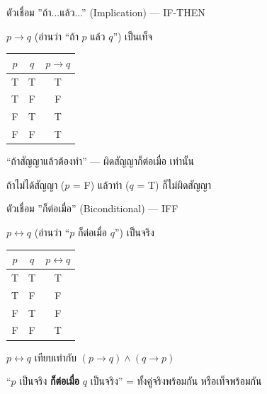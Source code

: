 \documentclass[11pt, aspectratio=169]{beamer}
\begin{document}
\begin{frame}{ตัวเชื่อม ''ถ้า...แล้ว...'' (Implication) — IF-THEN}
  \begin{explanation}[นิยาม]
    $p \to q$ (อ่านว่า ``ถ้า $p$ แล้ว $q$'') เป็นเท็จ 

    \medskip
    \begin{center}
      \begin{tabular}{cc|c}
        $p$ & $q$ & $p \to q$ \\
        \hline
        T & T & T \\
        T & F & F \\
        F & T & T \\
        F & F & T
      \end{tabular}
    \end{center}
  \end{explanation}

  \begin{intuition}[จำง่าย ๆ]
    ``ถ้าสัญญาแล้วต้องทำ'' — ผิดสัญญาก็ต่อเมื่อ  เท่านั้น

    ถ้าไม่ได้สัญญา ($p$ = F) แล้วทำ ($q$ = T) ก็ไม่ผิดสัญญา
  \end{intuition}
\end{frame}

\begin{frame}{ตัวเชื่อม ''ก็ต่อเมื่อ'' (Biconditional) — IFF}
  \begin{explanation}[นิยาม]
    $p \leftrightarrow q$ (อ่านว่า ``$p$ ก็ต่อเมื่อ $q$'') เป็นจริง 

    \medskip
    \begin{center}
      \begin{tabular}{cc|c}
        $p$ & $q$ & $p \leftrightarrow q$ \\
        \hline
        T & T & T \\
        T & F & F \\
        F & T & F \\
        F & F & T
      \end{tabular}
    \end{center}
  \end{explanation}

  \begin{intuition}[ความหมาย]
    $p \leftrightarrow q$ เทียบเท่ากับ $(p \to q) \land (q \to p)$

    ``$p$ เป็นจริง \textbf{ก็ต่อเมื่อ} $q$ เป็นจริง'' = ทั้งคู่จริงพร้อมกัน หรือเท็จพร้อมกัน
  \end{intuition}
\end{frame}
\end{document}
